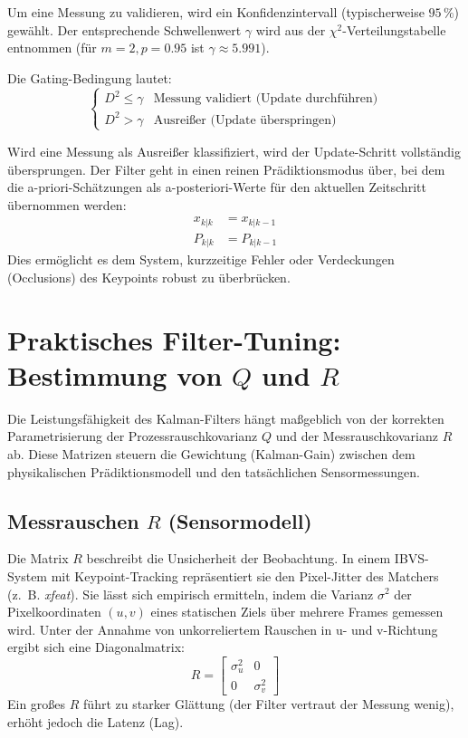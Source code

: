 \documentclass{article}
\begin{document}
Um eine Messung zu validieren, wird ein Konfidenzintervall (typischerweise $95\,\%$) gewählt. Der entsprechende Schwellenwert $\gamma$ wird aus der $\chi^2$-Verteilungstabelle entnommen (für $m=2, p=0.95$ ist $\gamma \approx 5.991$).

Die Gating-Bedingung lautet:
\begin{equation}
    \begin{cases} 
      D^2 \leq \gamma & \text{Messung validiert (Update durchführen)} \\
      D^2 > \gamma & \text{Ausreißer (Update überspringen)} 
   \end{cases}
\end{equation}

Wird eine Messung als Ausreißer klassifiziert, wird der Update-Schritt vollständig übersprungen. Der Filter geht in einen reinen Prädiktionsmodus über, bei dem die a-priori-Schätzungen als a-posteriori-Werte für den aktuellen Zeitschritt übernommen werden:
\begin{align}
    x_{k|k} &= x_{k|k-1} \\
    P_{k|k} &= P_{k|k-1}
\end{align}
Dies ermöglicht es dem System, kurzzeitige Fehler oder Verdeckungen (Occlusions) des Keypoints robust zu überbrücken.





\section{Praktisches Filter-Tuning: Bestimmung von $Q$ und $R$}
\label{sec:tuning}

Die Leistungsfähigkeit des Kalman-Filters hängt maßgeblich von der korrekten Parametrisierung der Prozessrauschkovarianz $Q$ und der Messrauschkovarianz $R$ ab. Diese Matrizen steuern die Gewichtung (Kalman-Gain) zwischen dem physikalischen Prädiktionsmodell und den tatsächlichen Sensormessungen.




\subsection{Messrauschen $R$ (Sensormodell)}
Die Matrix $R$ beschreibt die Unsicherheit der Beobachtung. In einem IBVS-System mit Keypoint-Tracking repräsentiert sie den Pixel-Jitter des Matchers (z.~B. \textit{xfeat}). Sie lässt sich empirisch ermitteln, indem die Varianz $\sigma^2$ der Pixelkoordinaten $(u,v)$ eines statischen Ziels über mehrere Frames gemessen wird. Unter der Annahme von unkorreliertem Rauschen in u- und v-Richtung ergibt sich eine Diagonalmatrix:
\begin{equation}
    R = \begin{bmatrix} \sigma_u^2 & 0 \\ 0 & \sigma_v^2 \end{bmatrix}
\end{equation}
Ein großes $R$ führt zu starker Glättung (der Filter vertraut der Messung wenig), erhöht jedoch die Latenz (Lag).
\end{document}
